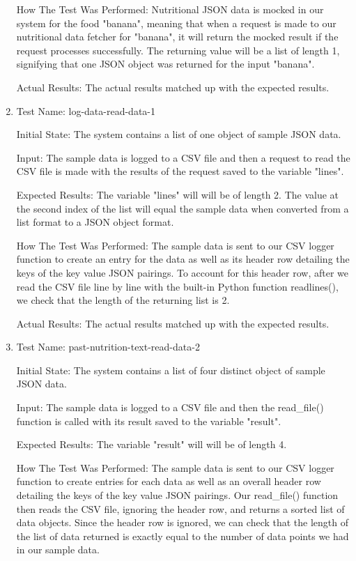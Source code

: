 \documentclass[12pt, titlepage]{article}
\begin{document}
\begin{enumerate}
		How The Test Was Performed: Nutritional JSON data is mocked in our system for the food "banana", meaning that when a request is made to our nutritional data fetcher for "banana", it will return the mocked result if the request processes successfully. The returning value will be a list of length 1, signifying that one JSON object was returned for the input "banana".
		
		Actual Results: The actual results matched up with the expected results.
        \item{Test Name: log-data-read-data-1}
		
		Initial State: The system contains a list of one object of sample JSON data.
		
		Input: The sample data is logged to a CSV file and then a request to read the CSV file is made with the results of the request saved to the variable "lines".
		
		Expected Results: The variable "lines" will will be of length 2. The value at the second index of the list will equal the sample data when converted from a list format to a JSON object format. 
		
		How The Test Was Performed: The sample data is sent to our CSV logger function to create an entry for the data as well as its header row detailing the keys of the key value JSON pairings. To account for this header row, after we read the CSV file line by line with the built-in Python function readlines(), we check that the length of the returning list is 2.
		
		Actual Results: The actual results matched up with the expected results.
        \item{Test Name: past-nutrition-text-read-data-2}
		
		Initial State: The system contains a list of four distinct object of sample JSON data.
		
		Input: The sample data is logged to a CSV file and then the read\_file() function is called with its result saved to the variable "result".
		
		Expected Results: The variable "result" will will be of length 4.
		
		How The Test Was Performed: The sample data is sent to our CSV logger function to create entries for each data as well as an overall header row detailing the keys of the key value JSON pairings. Our read\_file() function then reads the CSV file, ignoring the header row, and returns a sorted list of data objects. Since the header row is ignored, we can check that the length of the list of data returned is exactly equal to the number of data points we had in our sample data.
		

\end{enumerate}
\end{document}
